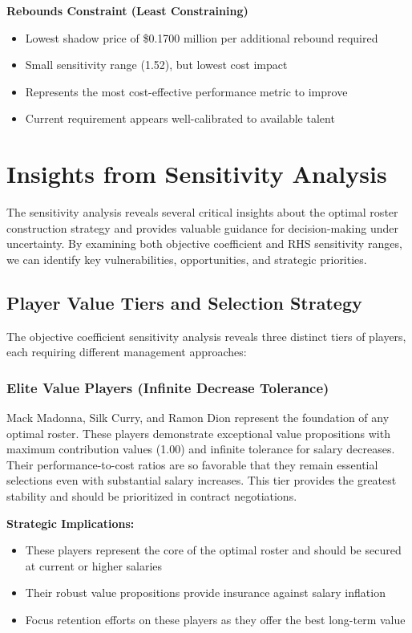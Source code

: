 \documentclass[a4paper,11pt]{article}
\begin{document}
\textbf{Rebounds Constraint (Least Constraining)}
\begin{itemize}
    \item Lowest shadow price of \$0.1700 million per additional rebound required
    \item Small sensitivity range (1.52), but lowest cost impact
    \item Represents the most cost-effective performance metric to improve
    \item Current requirement appears well-calibrated to available talent
\end{itemize}

\section{Insights from Sensitivity Analysis}

The sensitivity analysis reveals several critical insights about the optimal roster construction strategy and provides valuable guidance for decision-making under uncertainty. By examining both objective coefficient and RHS sensitivity ranges, we can identify key vulnerabilities, opportunities, and strategic priorities.

\subsection{Player Value Tiers and Selection Strategy}

The objective coefficient sensitivity analysis reveals three distinct tiers of players, each requiring different management approaches:

\subsubsection{Elite Value Players (Infinite Decrease Tolerance)}
Mack Madonna, Silk Curry, and Ramon Dion represent the foundation of any optimal roster. These players demonstrate exceptional value propositions with maximum contribution values (1.00) and infinite tolerance for salary decreases. Their performance-to-cost ratios are so favorable that they remain essential selections even with substantial salary increases. This tier provides the greatest stability and should be prioritized in contract negotiations.

\textbf{Strategic Implications:}
\begin{itemize}
    \item These players represent the core of the optimal roster and should be secured at current or higher salaries
    \item Their robust value propositions provide insurance against salary inflation
    \item Focus retention efforts on these players as they offer the best long-term value
\end{itemize}
\end{document}

